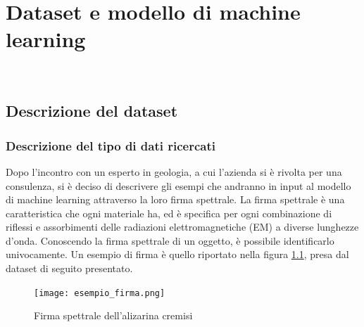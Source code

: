 
\chapter{Dataset e modello di machine learning}
\label{cap:machine-learning}

\\

\section{Descrizione del dataset}
\subsection{Descrizione del tipo di dati ricercati}
Dopo l'incontro con un esperto in geologia, a cui l'azienda si è rivolta per una consulenza, si è deciso di descrivere gli esempi che andranno in input al modello di machine learning attraverso la loro firma spettrale.
La firma spettrale è una caratteristica che ogni materiale ha, ed è specifica per ogni combinazione di riflessi e assorbimenti delle radiazioni elettromagnetiche (EM) a diverse lunghezze d'onda. Conoscendo la firma spettrale di un oggetto, è possibile identificarlo univocamente.
Un esempio di firma è quello riportato nella figura \ref{fig:esempio_firma}, presa dal dataset di seguito presentato.
\begin{figure}
    \centering
    \texttt{[image: esempio\_firma.png]}
    \caption{Firma spettrale dell'alizarina cremisi}
    \label{fig:esempio_firma}
\end{figure}

